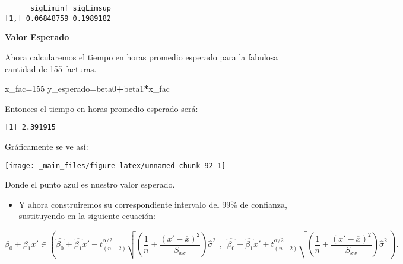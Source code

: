 \documentclass[
  a4paper,
  oneside,
  openany]{book}
\newenvironment{Shaded}{\begin{snugshade}}{\end{snugshade}}
\newcommand{\DecValTok}[1]{\textcolor[rgb]{0.00,0.00,0.81}{#1}}
\newcommand{\NormalTok}[1]{#1}
\newcommand{\OtherTok}[1]{\textcolor[rgb]{0.56,0.35,0.01}{#1}}
\newcommand{\SpecialCharTok}[1]{\textcolor[rgb]{0.81,0.36,0.00}{\textbf{#1}}}
\providecommand{\tightlist}{%
  \setlength{\itemsep}{0pt}\setlength{\parskip}{0pt}}
\begin{document}
\begin{verbatim}
      sigLiminf sigLimsup
[1,] 0.06848759 0.1989182
\end{verbatim}

\textbf{Valor Esperado}

Ahora calcularemos el tiempo en horas promedio esperado para la fabulosa cantidad de 155 facturas.

\begin{Shaded}
\begin{Highlighting}[]
\NormalTok{x\_fac}\OtherTok{=}\DecValTok{155}
\NormalTok{y\_esperado}\OtherTok{=}\NormalTok{beta0}\SpecialCharTok{+}\NormalTok{beta1}\SpecialCharTok{*}\NormalTok{x\_fac}
\end{Highlighting}
\end{Shaded}

Entonces el tiempo en horas promedio esperado será:

\begin{verbatim}
[1] 2.391915
\end{verbatim}

Gráficamente se ve así:

\begin{center}\texttt{[image: \_main\_files/figure-latex/unnamed-chunk-92-1]} \end{center}

Donde el punto azul es nuestro valor esperado.

\begin{itemize}
\tightlist
\item
  Y ahora construiremos su correspondiente intervalo del 99\% de confianza, sustituyendo en la siguiente ecuación:
\end{itemize}

\[\beta_{0}+\beta_{1}x' \in \left(\hat{\beta_{0}}+\hat{\beta_{1}}x'-t_{(n-2)}^{\alpha/2}\sqrt{\left( \frac{1}{n}+\frac{(x'-\overline{x})^2}{S_{xx}}\right)}\hat{\sigma}^2 \ \ , \ \ \hat{\beta_{0}}+\hat{\beta_{1}}x'+t_{(n-2)}^{\alpha/2}\sqrt{\left( \frac{1}{n}+\frac{(x'-\overline{x})^2}{S_{xx}}\right)\hat{\sigma}^2} \ \right).\]
\end{document}
